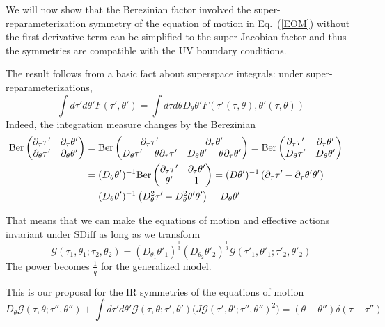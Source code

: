 \documentclass[aps,pre,preprint,onecolumn,citeautoscript,superscriptaddress,nofootinbib,eqsecnum]{revtex4-1}
\newcommand{\beq}{\begin{equation}}
\newcommand{\eeq}{\end{equation}}
\begin{document}
We will now show that the Berezinian factor involved the super-reparameterization symmetry of the equation of motion in Eq.~(\ref{EOM}) 
without the first derivative term can be simplified to the super-Jacobian factor and thus the symmetries are compatible with the UV boundary conditions. 

The result follows from a basic fact about superspace integrals: under super-reparameterizations, 
\begin{equation}
\int d \tau' d \theta' F(\tau', \theta')  = \int d \tau d \theta D_\theta \theta' F\left(\tau'(\tau, \theta), \theta' (\tau, \theta)\right) 
\end{equation}
Indeed, the integration measure changes by the Berezinian 
\begin{align}
\mathrm{Ber} \begin{pmatrix}\partial_\tau \tau' &  \partial_\tau \theta'  \cr \partial_\theta \tau' & \partial_\theta \theta'  \end{pmatrix} 
&= \mathrm{Ber} \begin{pmatrix}\partial_\tau \tau'  & \partial_\tau \theta'  \cr D_\theta \tau' - \theta \partial_\tau \tau' &  D_\theta \theta' - \theta \partial_\tau \theta' \end{pmatrix} =\mathrm{Ber} \begin{pmatrix}\partial_\tau \tau'  & \partial_\tau \theta'  \cr D_\theta \tau'  &  D_\theta \theta' \end{pmatrix} \cr
&= (D_\theta\theta')^{-1} \mathrm{Ber} \begin{pmatrix}\partial_\tau \tau'  & \partial_\tau \theta'  \cr \theta'  &  1\end{pmatrix}= (D\theta')^{-1}\left( \partial_\tau \tau'  - \partial_\tau \theta' \theta'  \right) \cr
&= (D_\theta\theta')^{-1}\left( D_\theta^2 \tau'  - D_\theta^2 \theta' \theta'  \right) = D_\theta\theta'
\end{align}

That means that we can make the equations of motion and effective actions invariant under $\mathrm{SDiff}$ 
as long as we transform
\begin{equation}
\mathcal{G}(\tau_1,\theta_1;\tau_2,\theta_2) = (D_{\theta_1} \theta'_1)^{\frac13} (D_{\theta_2} \theta'_2)^{\frac13} \mathcal{G}(\tau'_1,\theta'_1;\tau'_2,\theta'_2)
\end{equation}
The power becomes $\frac{1}{\hat q}$ for the generalized model. 

This is our proposal for the IR symmetries of the equations of motion 
\beq 
D_\theta \mathcal{G}(\tau,\theta ;\tau'',\theta'' )+\int d\tau'd\theta' \mathcal{  G}(\tau,\theta ;\tau',\theta' )\big(J \mathcal{G}(\tau',\theta';\tau'',\theta''   )^2\big)=(  \theta-  \theta'')\delta(\tau   -\tau''  )\label{EOMN1}
\eeq
\end{document}
